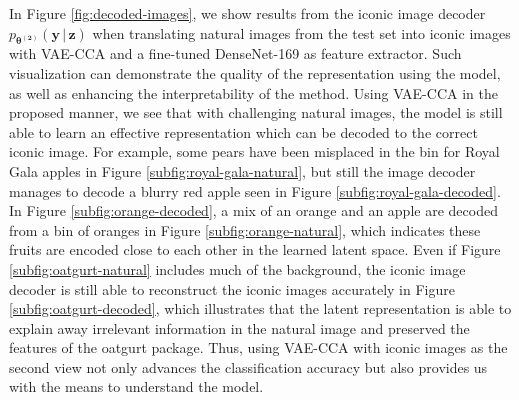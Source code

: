 In Figure \ref{fig:decoded-images}, we show results from the iconic image decoder $p_{\boldsymbol{\theta^{(2)}}}(\mathbf{y}\,|\,\mathbf{z})$ when translating natural images from the test set into iconic images with VAE-CCA and a fine-tuned DenseNet-169 as feature extractor. Such visualization can demonstrate the quality of the representation using the model, as well as enhancing the interpretability of the method. Using VAE-CCA in the proposed manner, we see that with challenging natural images, the model is still able to learn an effective representation which can be decoded to the correct iconic image. For example, some pears have been misplaced in the bin for Royal Gala apples in Figure \ref{subfig:royal-gala-natural}, but still the image decoder manages to decode a blurry red apple seen in Figure \ref{subfig:royal-gala-decoded}. In Figure \ref{subfig:orange-decoded}, a mix of an orange and an apple are decoded from a bin of oranges in Figure \ref{subfig:orange-natural}, which indicates these fruits are encoded close to each other in the learned latent space. Even if Figure \ref{subfig:oatgurt-natural} includes much of the background, the iconic image decoder is still able to reconstruct the iconic images accurately in Figure \ref{subfig:oatgurt-decoded}, which illustrates that the latent representation is able to explain away irrelevant information in the natural image and preserved the features of the oatgurt package. Thus, using VAE-CCA with iconic images as the second view not only advances the classification accuracy but also provides us with the means to understand the model.


